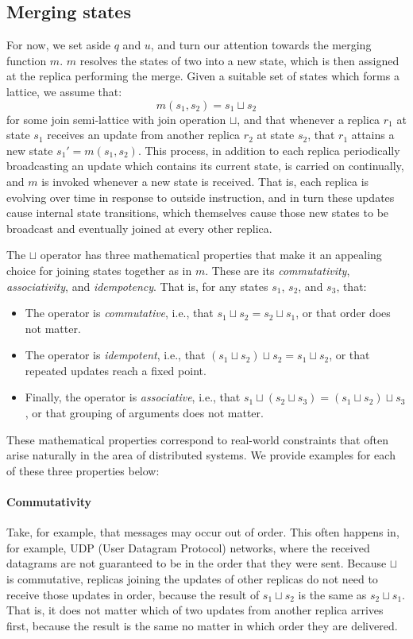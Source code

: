 \subsection{Merging states}

For now, we set aside $q$ and $u$, and turn our attention towards the merging
function $m$. $m$ resolves the states of two \CRDTs into a new state, which is
then assigned at the replica performing the merge. Given a suitable set of
states which forms a lattice, we assume that:
\[
  m(s_1, s_2) = s_1 \sqcup s_2
\]
for some join semi-lattice with join operation $\sqcup$, and that whenever a
\CRDT replica $r_1$ at state $s_1$ receives an update from another replica
$r_2$ at state $s_2$, that $r_1$ attains a new state $s_1' = m(s_1, s_2)$.
This process, in addition to each replica periodically broadcasting an update
which contains its current state, is carried on continually, and $m$ is
invoked whenever a new state is received. That is, each replica is evolving
over time in response to outside instruction, and in turn these updates cause
internal state transitions, which themselves cause those new states to be
broadcast and eventually joined at every other replica.

The $\sqcup$ operator has three mathematical properties that make it an
appealing choice for joining states together as in $m$. These are its
\emph{commutativity}, \emph{associativity}, and \emph{idempotency}. That is, for
any states $s_1$, $s_2$, and $s_3$, that:
\begin{itemize}
  \item The operator is \emph{commutative}, i.e., that $s_1 \sqcup s_2 = s_2
    \sqcup s_1$, or that order does not matter.
  \item The operator is \emph{idempotent}, i.e., that $(s_1 \sqcup s_2)
    \sqcup s_2 = s_1 \sqcup s_2$, or that repeated updates reach a fixed point.
  \item Finally, the operator is \emph{associative}, i.e., that $s_1 \sqcup (s_2
    \sqcup s_3) = (s_1 \sqcup s_2) \sqcup s_3$, or that grouping of arguments
    does not matter.
\end{itemize}

These mathematical properties correspond to real-world constraints that often
arise naturally in the area of distributed systems. We provide examples for each
of these three properties below:

\paragraph{Commutativity} Take, for example, that messages may occur out of
order. This often happens in, for example, UDP (User Datagram Protocol)
networks, where the received datagrams are not guaranteed to be in the order
that they were sent. Because $\sqcup$ is commutative, replicas joining the
updates of other replicas do not need to receive those updates in order, because
the result of $s_1 \sqcup s_2$ is the same as $s_2 \sqcup s_1$.  That is, it
does not matter which of two updates from another replica arrives first, because
the result is the same no matter in which order they are delivered.

